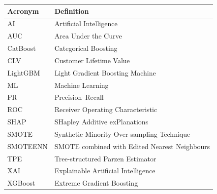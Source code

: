 \documentclass[a4paper,twoside]{article}
\begin{document}
\begin{table}[H]
\centering
\begin{tabular}{ll}
\toprule
\textbf{Acronym} & \textbf{Definition} \\
\midrule
AI       & Artificial Intelligence \\
AUC      & Area Under the Curve \\
CatBoost & Categorical Boosting \\
CLV      & Customer Lifetime Value \\
LightGBM & Light Gradient Boosting Machine \\
ML       & Machine Learning \\
PR       & Precision--Recall \\
ROC      & Receiver Operating Characteristic \\
SHAP     & SHapley Additive exPlanations \\
SMOTE    & Synthetic Minority Over-sampling Technique \\
SMOTEENN & SMOTE combined with Edited Nearest Neighbours \\
TPE      & Tree-structured Parzen Estimator \\
XAI      & Explainable Artificial Intelligence \\
XGBoost  & Extreme Gradient Boosting \\
\bottomrule
\end{tabular}
\end{table}


{\small
}
\end{document}
